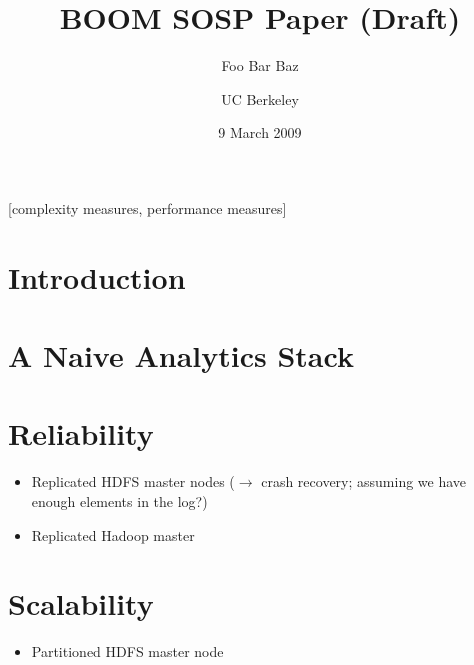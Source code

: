 \documentclass{sig-alternate}
\begin{document}

\title{BOOM SOSP Paper (Draft)}
\author{
\alignauthor
Foo
\alignauthor
Bar
\alignauthor
Baz
\and
UC Berkeley
}
\date{9 March 2009}

\maketitle
\begin{abstract}
\end{abstract}

[complexity measures, performance measures]


\section{Introduction}

\section{A Naive Analytics Stack}

\section{Reliability}
\begin{itemize}
\item
  Replicated HDFS master nodes ($\to$ crash recovery; assuming we have
  enough elements in the log?)

\item
  Replicated Hadoop master
\end{itemize}

\section{Scalability}
\begin{itemize}
\item
  Partitioned HDFS master node
\end{itemize}
\end{document}
